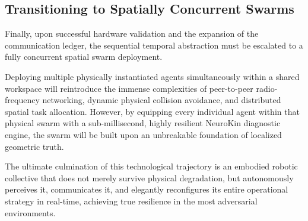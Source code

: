\documentclass[12pt,a4paper,oneside]{report}
\begin{document}
\subsection{Transitioning to Spatially Concurrent Swarms}

Finally, upon successful hardware validation and the expansion of the communication ledger, the sequential temporal abstraction must be escalated to a fully concurrent spatial swarm deployment. 

Deploying multiple physically instantiated agents simultaneously within a shared workspace will reintroduce the immense complexities of peer-to-peer radio-frequency networking, dynamic physical collision avoidance, and distributed spatial task allocation. However, by equipping every individual agent within that physical swarm with a sub-millisecond, highly resilient NeuroKin diagnostic engine, the swarm will be built upon an unbreakable foundation of localized geometric truth. 

The ultimate culmination of this technological trajectory is an embodied robotic collective that does not merely survive physical degradation, but autonomously perceives it, communicates it, and elegantly reconfigures its entire operational strategy in real-time, achieving true resilience in the most adversarial environments.
\end{document}

